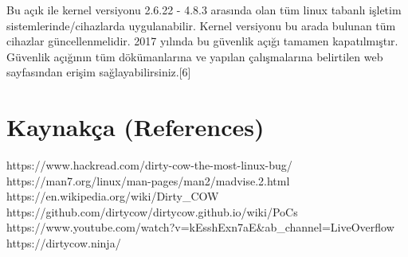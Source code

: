 \documentclass[conference, 12pt, a4paper]{IEEEtran}
\begin{document}
\begin{sloppypar}
    Bu açık ile kernel versiyonu 2.6.22 - 4.8.3 arasında olan tüm linux tabanlı işletim sistemlerinde/cihazlarda uygulanabilir. Kernel versiyonu bu arada bulunan tüm cihazlar güncellenmelidir. 2017 yılında bu güvenlik açığı tamamen kapatılmıştır.
    Güvenlik açığının tüm dökümanlarına ve yapılan çalışmalarına belirtilen web sayfasından erişim sağlayabilirsiniz.[6]

\section{Kaynakça (References)}
\begin{thebibliography}{00}
     https://www.hackread.com/dirty-cow-the-most-linux-bug/
     https://man7.org/linux/man-pages/man2/madvise.2.html
     https://en.wikipedia.org/wiki/Dirty\_COW
     https://github.com/dirtycow/dirtycow.github.io/wiki/PoCs
     https://www.youtube.com/watch?v=kEsshExn7aE\&ab\_channel=LiveOverflow
     https://dirtycow.ninja/
    
\end{thebibliography}

\end{sloppypar}
\end{document}
